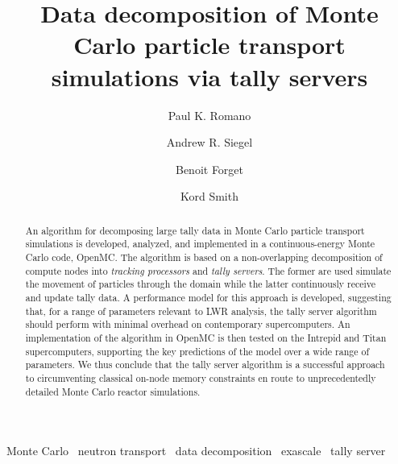 \documentclass[3p,fleqn]{elsarticle}
\begin{document}
\begin{frontmatter}

\title{Data decomposition of Monte Carlo particle transport simulations via
  tally servers}
\author[mit]{Paul K. Romano}

\author[anl]{Andrew R. Siegel}

\author[mit]{Benoit Forget}

\author[mit]{Kord Smith}

\address[mit]{Massachusetts Institute of Technology, Department of Nuclear
  Science and Engineering, 77 Massachusetts Ave., Cambridge, MA 02139, United
  States}

\address[anl]{Argonne National Laboratory, Theory and Computing Sciences, 9700 S
  Cass Ave., Argonne, IL 60439, United States}

\begin{abstract}
An algorithm for decomposing large tally data in Monte Carlo particle transport
simulations is developed, analyzed, and implemented in a continuous-energy Monte
Carlo code, OpenMC. The algorithm is based on a non-overlapping decomposition of
compute nodes into \emph{tracking processors} and \emph{tally servers}. The
former are used simulate the movement of particles through the domain while the
latter continuously receive and update tally data. A performance model for this
approach is developed, suggesting that, for a range of parameters relevant to
LWR analysis, the tally server algorithm should perform with minimal overhead on
contemporary supercomputers. An implementation of the algorithm in OpenMC is
then tested on the Intrepid and Titan supercomputers, supporting the key
predictions of the model over a wide range of parameters. We thus conclude that
the tally server algorithm is a successful approach to circumventing classical
on-node memory constraints en route to unprecedentedly detailed Monte Carlo
reactor simulations.
\end{abstract}

\begin{keyword}
  Monte Carlo \ neutron transport \ data decomposition \ exascale \ tally server
\end{keyword}

\end{frontmatter}

\end{document}
